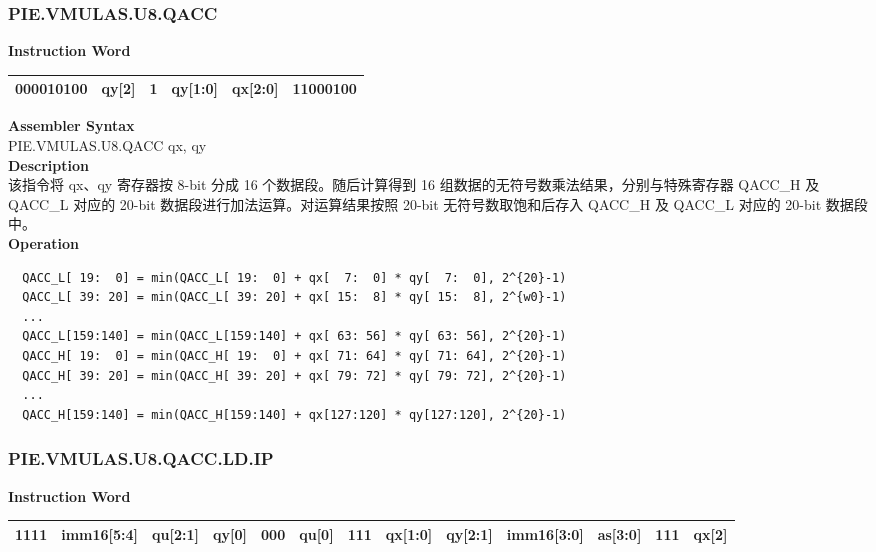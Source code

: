 \newpage
\subsubsection{PIE.VMULAS.U8.QACC}\label{instruction:PIEVMULASU8QACC}
\setlength\tabcolsep{6pt}
\textbf{Instruction Word} \\
\begin{tabular}{|c|c|c|c|c|c|}
	\hline
	000010100 & qy[2] & 1 & qy[1:0] & qx[2:0] & 11000100 \\
	\hline
\end{tabular}

\textbf{Assembler Syntax} \\
PIE.VMULAS.U8.QACC qx, qy \\
\textbf{Description} \\
该指令将 qx、qy 寄存器按 8-bit 分成 16 个数据段。随后计算得到 16 组数据的无符号数乘法结果，分别与特殊寄存器 QACC\_H 及 QACC\_L 对应的 20-bit 数据段进行加法运算。对运算结果按照 20-bit 无符号数取饱和后存入 QACC\_H 及 QACC\_L 对应的 20-bit 数据段中。\\
\textbf{Operation}
\begin{lstlisting}
  QACC_L[ 19:  0] = min(QACC_L[ 19:  0] + qx[  7:  0] * qy[  7:  0], 2^{20}-1)
  QACC_L[ 39: 20] = min(QACC_L[ 39: 20] + qx[ 15:  8] * qy[ 15:  8], 2^{w0}-1)
  ...
  QACC_L[159:140] = min(QACC_L[159:140] + qx[ 63: 56] * qy[ 63: 56], 2^{20}-1)
  QACC_H[ 19:  0] = min(QACC_H[ 19:  0] + qx[ 71: 64] * qy[ 71: 64], 2^{20}-1)
  QACC_H[ 39: 20] = min(QACC_H[ 39: 20] + qx[ 79: 72] * qy[ 79: 72], 2^{20}-1)
  ...
  QACC_H[159:140] = min(QACC_H[159:140] + qx[127:120] * qy[127:120], 2^{20}-1)
\end{lstlisting}

\newpage
\subsubsection{PIE.VMULAS.U8.QACC.LD.IP}\label{instruction:PIEVMULASU8QACCLDIP}
\setlength\tabcolsep{6pt}
\textbf{Instruction Word} \\
\begin{tabular}{|c|c|c|c|c|c|c|c|c|c|c|c|c|}
	\hline
	1111 & imm16[5:4] & qu[2:1] & qy[0] & 000 & qu[0] & 111 & qx[1:0] & qy[2:1] & imm16[3:0] & as[3:0] & 111 & qx[2] \\
	\hline
\end{tabular}

